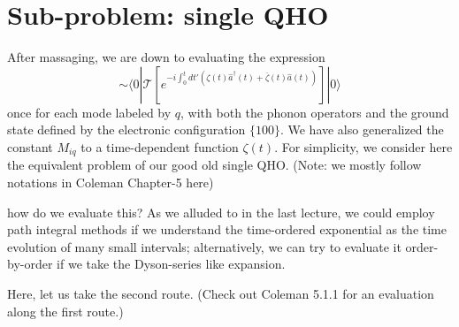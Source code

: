 \section{Sub-problem: single QHO}

After massaging, we are down to evaluating the expression
\[\sim \langle 0|\mathcal{T} \left[ e^{-i\int_0^t{dt'\left( \zeta \left( t \right) \hat{a}^{\dagger}\left( t \right) +\bar{\zeta}\left( t \right) \hat{a}\left( t \right) \right)}} \right] |0\rangle \]
once for each mode labeled by $q$, with both the phonon operators and the ground state defined by the electronic configuration $\{100\}$. We have also generalized the constant $M_{iq}$ to a time-dependent function $\zeta(t)$. For simplicity, we consider here the equivalent problem of our good old single QHO. (Note: we mostly follow notations in Coleman Chapter-5 here)

how do we evaluate this? As we alluded to in the last lecture, we could employ path integral methods if we understand the time-ordered exponential as the time evolution of many small intervals; alternatively, we can try to evaluate it order-by-order if we take the Dyson-series like expansion.

Here, let us take the second route. (Check out Coleman 5.1.1 for an evaluation along the first route.)

